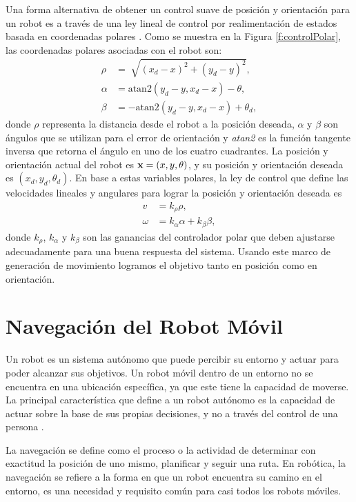 Una forma alternativa de obtener un control suave de posición y orientación 
para un robot es a través de una ley lineal de control por realimentación 
de estados basada en coordenadas polares \cite{chwa2004sliding}. Como se muestra 
en la Figura \ref{f:controlPolar}, las coordenadas polares asociadas con el robot 
son:
\begin{align*}
\rho &= \sqrt[]{(x_{d} - x)^2 + (y_{d} - y)^2}, \\
\alpha &= \text{atan2}(y_{d} - y, x_{d} - x) - \theta, \\
\beta &= -\text{atan2}(y_{d} - y, x_{d} - x) + \theta_{d},
\end{align*}
donde $\rho$ representa la distancia desde el robot a la posición deseada, $\alpha$
y $\beta$ son ángulos que se utilizan para el error de orientación y \textit{atan2} es
la función tangente inversa que retorna el ángulo en uno de los cuatro cuadrantes. La posición y 
orientación actual del robot es $\mathbf x=(x,y,\theta)$, y su posición y orientación deseada 
es $(x_{d},y_{d},\theta_{d})$. En base a estas variables polares, la ley de control que 
define las velocidades lineales y angulares para lograr la posición y orientación deseada 
es 
\begin{align}
\label{eqn:v}
v &= k_{\rho}\rho, \\
\label{eqn:w}
\omega &= k_{\alpha}\alpha + k_{\beta}\beta,
\end{align}
donde $k_{\rho}$, $k_{\alpha}$ y $k_{\beta}$ son las ganancias del controlador 
polar que deben ajustarse adecuadamente para una buena respuesta del sistema. Usando 
este marco de generación de movimiento logramos el objetivo tanto en posición 
como en orientación.

\section{Navegación del Robot Móvil}

Un robot es un sistema autónomo que puede percibir su entorno y actuar para poder
alcanzar sus objetivos. Un robot móvil dentro de un entorno no se encuentra en una 
ubicación específica, ya que este tiene la capacidad de moverse. La 
principal característica que define a un robot autónomo es la capacidad de actuar 
sobre la base de sus propias decisiones, y no a través del control de una 
persona \cite{mataric2007robotics}.

La navegación se define como el proceso o la actividad de determinar con exactitud 
la posición de uno mismo, planificar y seguir una ruta. En robótica, la navegación 
se refiere a la forma en que un robot encuentra su camino en el entorno, es una 
necesidad y requisito común para casi todos los robots móviles. %

